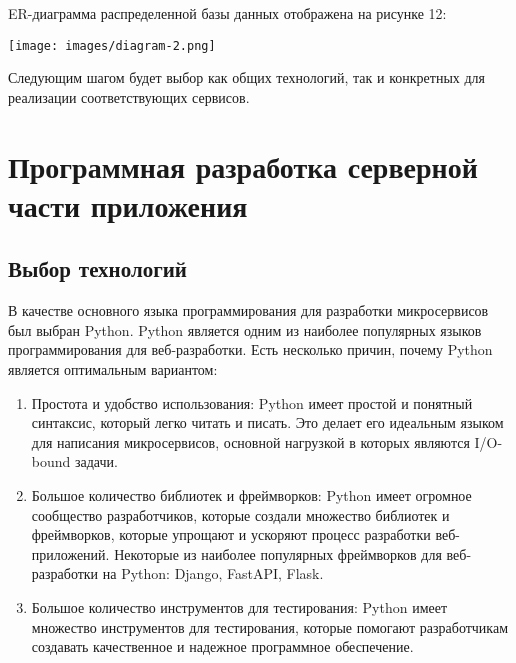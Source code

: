     ER-диаграмма распределенной базы данных отображена на рисунке 12:

    \noindent\begin{minipage}[t]{\textwidth}
                 \begin{center}
                 \texttt{[image: images/diagram-2.png]}
                 \end{center} \label{fig:Moreno}
            
            \end{minipage}
    

    Следующим шагом будет выбор как общих технологий, так и конкретных для реализации соответствующих сервисов. 

\chapter{Программная разработка серверной части приложения}
    \section{Выбор технологий}
    В качестве основного языка программирования для разработки микросервисов был выбран Python. Python является одним из наиболее популярных языков программирования для веб-разработки. Есть несколько причин, почему Python является оптимальным вариантом:

    \begin{enumerate}
        \item Простота и удобство использования: Python имеет простой и понятный синтаксис, который легко читать и писать. Это делает его идеальным языком для написания микросервисов, основной нагрузкой в которых являются I/O-bound задачи.
        \item Большое количество библиотек и фреймворков: Python имеет огромное сообщество разработчиков, которые создали множество библиотек и фреймворков, которые упрощают и ускоряют процесс разработки веб-приложений. Некоторые из наиболее популярных фреймворков для веб-разработки на Python: Django, FastAPI, Flask.
        \item Большое количество инструментов для тестирования: Python имеет множество инструментов для тестирования, которые помогают разработчикам создавать качественное и надежное программное обеспечение.
    \end{enumerate}

